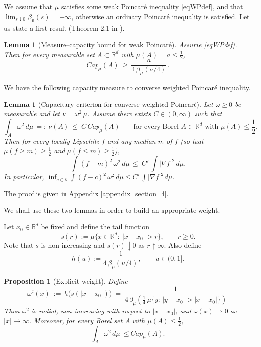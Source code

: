 \documentclass[11pt,reqno]{amsart}
\numberwithin{equation}{section}
\newtheorem{lemma}[theorem]{Lemma}
\newtheorem{proposition}[theorem]{Proposition}
\theoremstyle{definition}
\theoremstyle{remark}
\begin{document}
We assume that $\mu$ satisfies some weak Poincar\'e inequality \eqref{eqWPdef}, and that $\lim_{s\downarrow 0}\beta_\mu(s)=+\infty$, otherwise an ordinary Poincar\'e inequality is satisfied. Let us  state a first result (Theorem 2.1 in  \cite{BCR2}).
\begin{lemma}[Measure--capacity bound for weak Poincar\'e]\label{prop:cap-lb}
Assume \eqref{eqWPdef}. Then for every measurable set $A\subset\mathbb R^d$ with $\mu(A)=a\le\frac12$,
\begin{equation}\label{eq:cap-lower}
  Cap_\mu(A)\ \ge\ \frac{a}{4\,\beta_\mu(a/4)} \, .
\end{equation}
\end{lemma}
We have the following capacity measure to converse weighted Poincar\'e inequality. 
\begin{lemma}[Capacitary criterion for converse weighted Poincar\'e]\label{lem:cap-to-weighted}
Let $\omega\ge0$ be measurable and let $\nu=\omega^2 \, \mu$.
Assume there exists $C\in(0,\infty)$ such that
\begin{equation}\label{eq:nuCap}
  \int_A \omega^2 \, d\mu\ =:\ \nu(A)\ \le\ C \, Cap_\mu(A)\qquad\text{for every Borel }A\subset\mathbb R^d\text{ with }\mu(A)\le\frac12.
\end{equation}
Then for every locally Lipschitz $f$ and any median $m$ of $f$ (so that $\mu(f\ge m)\ge\tfrac12$ and $\mu(f\le m)\ge\tfrac12$),
\begin{equation}\label{eq:weightedPoincareC}
  \int (f-m)^2\,\omega^2 \,d\mu \ \le\ C'\,\int |\nabla f|^2\,d\mu.
\end{equation}
In particular,
\(
\inf_{c\in\mathbb R}\int (f-c)^2\,\omega^2 \, d\mu \le C'\,\int |\nabla f|^2\,d\mu.
\)
\end{lemma}
The proof is given in Appendix \ref{appendix_section_4}.

We shall use these two lemmas in order to build an appropriate weight.

Let $x_0\in\mathbb R^d$ be fixed and define the tail function
\begin{equation}\label{eq:tail}
  s(r):=\mu\{x\in\mathbb R^d:\ |x-x_0|>r\},\qquad r\ge0.
\end{equation}
Note that $s$ is non-increasing and $s(r)\downarrow0$ as $r\uparrow\infty$. Also define
\begin{equation}\label{eq:h-def}
  h(u):=\frac{1}{4\,\beta_\mu(u/4)},\qquad u\in(0,1].
\end{equation}

\begin{proposition}[Explicit weight]\label{prop:explicit-weight}
Define
\begin{equation}\label{eq:omega-explicit}
  \omega^2(x)\ :=\ h\bigl(s(|x-x_0|)\bigr)
  \ =\ \frac{1}{4\,\beta_\mu\!\left(\tfrac14\,\mu\{y:\ |y-x_0|>|x-x_0|\}\right)}.
\end{equation}
Then $\omega^2$ is radial, non-increasing with respect to $|x-x_0|$, and $\omega(x)\to0$ as $|x|\to\infty$.
Moreover, for every Borel set $A$ with $\mu(A)\le\tfrac12$,
\begin{equation}\label{eq:nu-cap-small}
  \int_A \omega^2\,d\mu \ \le Cap_\mu(A).
\end{equation}
\end{proposition}
\end{document}
